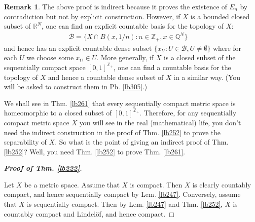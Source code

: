 \documentclass[12pt,b5paper,notitlepage]{article}
\theoremstyle{definition}
\newtheorem{rem}[df]{Remark}
\theoremstyle{plain}
\newcommand{\mc}{\mathcal}
\newcommand{\Zbb}{\mathbb Z}
\newcommand{\Qbb}{\mathbb Q}
\newcommand{\Rbb}{\mathbb R}
\numberwithin{equation}{section}
\begin{document}
\begin{rem}
The above proof is indirect because it proves the existence of $E_n$ by contradiction but not by explicit construction. However, if $X$ is a bounded closed subset of $\Rbb^N$, one can find an explicit countable basis for the topology of $X$:
\begin{align*}
\mc B=\{X\cap B(x,1/n):n\in\Zbb_+,x\in\Qbb^N\}
\end{align*}
and hence has an explicit countable dense subset $\{x_U:U\in\mc B,U\neq\emptyset\}$ where for each $U$ we choose some $x_U\in U$. More generally, if $X$ is a closed subset of the sequentially compact space $[0,1]^{\Zbb_+}$, one can find a countable basis for the topology of $X$ and hence a countable dense subset of $X$ in a similar way. (You will be asked to construct them in Pb. \ref{lb305}.) 


We shall see in Thm. \ref{lb261} that every sequentially compact metric space is homeomorphic to a closed subset of $[0,1]^{\Zbb_+}$. Therefore, for any sequentially compact metric space $X$ you will see in the real (mathematical) life, you don't need the indirect construction in the proof of Thm. \ref{lb252} to prove the separability of $X$. So what is the point of giving an indirect proof of Thm. \ref{lb252}? Well, you need Thm. \ref{lb252} to prove Thm. \ref{lb261}.  \hfill\qedsymbol
\end{rem}





\begin{proof}[\textbf{Proof of Thm. \ref{lb222}}] \hypertarget{target1}{}
Let $X$ be a metric space. Assume that $X$ is compact. Then $X$ is clearly countably compact, and hence sequentially compact by Lem. \ref{lb247}. Conversely, assume that $X$ is sequentially compact. Then by Lem. \ref{lb247} and Thm. \ref{lb252}, $X$ is countably compact and Lindel\"of, and hence compact.
\end{proof}
\end{document}

